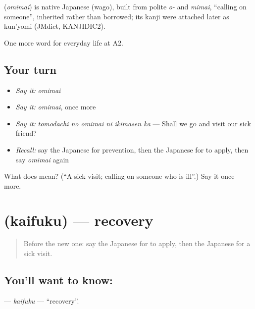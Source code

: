 \begin{cousinweb}
\textbf{} (\emph{omimai}) is native Japanese (wago), built from polite \emph{o-} and \emph{mimai}, \textquotedblleft{}calling on someone\textquotedblright{}, inherited rather than borrowed; its kanji were attached later as kun'yomi (JMdict, KANJIDIC2).
\end{cousinweb}

\begin{grammarlens}[title={What you've built}]
One more word for everyday life at A2.
\end{grammarlens}

\subsection*{Your turn}
\begin{itemize}
\raggedright
  \item \emph{Say it:} \emph{omimai}
  \item \emph{Say it:} \emph{omimai}, once more
  \item \emph{Say it:} \emph{tomodachi no omimai ni ikimasen ka} — Shall we go and visit our sick friend?
  \item \emph{Recall:} say the Japanese for prevention, then the Japanese for to apply, then say \emph{omimai} again
\end{itemize}

\begin{tcolorbox}[breakable,colback=teal!4,colframe=teal!35!black,title={Before you move on}]
What does  mean? (\textquotedblleft{}A sick visit; calling on someone who is ill\textquotedblright{}.) Say it once more.
\end{tcolorbox}
\section[\texorpdfstring{\ja{かいふく} (kaifuku)}{かいふく (kaifuku)}]{ (kaifuku) — recovery}

\label{lesson:JA-C222-kaifuku}



\begin{quote}
Before the new one: say the Japanese for to apply, then the Japanese for a sick visit.
\end{quote}

\subsection*{You'll want to know: }
\textbf{} — \emph{kaifuku} — \textquotedblleft{}recovery\textquotedblright{}.

